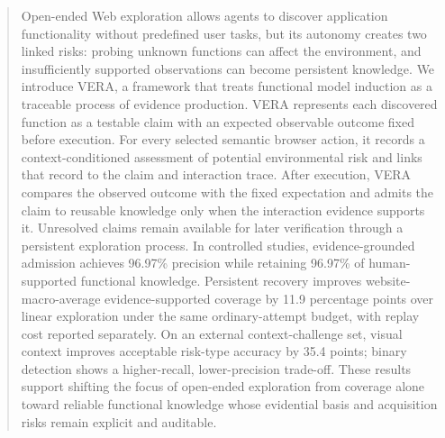 \begin{abstract}
Open-ended Web exploration allows agents to discover application functionality
without predefined user tasks, but its autonomy creates two linked risks:
probing unknown functions can affect the environment, and insufficiently
supported observations can become persistent knowledge. We introduce VERA, a
framework that treats functional model induction as a traceable process of
evidence production. VERA represents each discovered function as a testable
claim with an expected observable outcome fixed before execution. For every
selected semantic browser action, it records a context-conditioned assessment
of potential environmental risk and links that record to the claim and
interaction trace. After execution, VERA compares the observed outcome with the
fixed expectation and admits the claim to reusable knowledge only when the
interaction evidence supports it. Unresolved claims remain available for later
verification through a persistent exploration process. In controlled studies,
evidence-grounded admission achieves 96.97\% precision while retaining 96.97\%
of human-supported functional knowledge. Persistent recovery improves
website-macro-average evidence-supported coverage by 11.9 percentage points
over linear exploration under the same ordinary-attempt budget, with replay
cost reported separately. On an external context-challenge set, visual context
improves acceptable risk-type accuracy by 35.4 points; binary detection shows a
higher-recall, lower-precision trade-off. These results support shifting the
focus of open-ended exploration from coverage alone toward reliable functional
knowledge whose evidential basis and acquisition risks remain explicit and
auditable.
\end{abstract}
